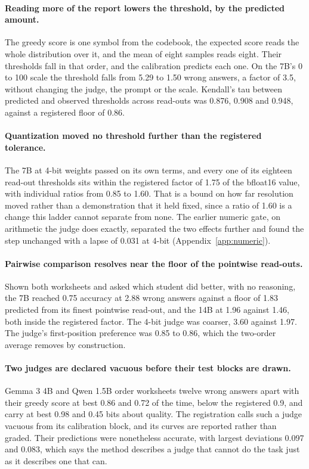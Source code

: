 \documentclass{article}
\theoremstyle{definition}
\theoremstyle{remark}
\begin{document}
\paragraph{Reading more of the report lowers the threshold, by the predicted amount.}
The greedy score is one symbol from the codebook, the expected score reads the whole distribution over it, and the mean of eight samples reads eight.
Their thresholds fall in that order, and the calibration predicts each one.
On the 7B's 0 to 100 scale the threshold falls from 5.29 to 1.50 wrong answers, a factor of 3.5, without changing the judge, the prompt or the scale.
Kendall's tau between predicted and observed thresholds across read-outs was 0.876, 0.908 and 0.948, against a registered floor of 0.86.

\paragraph{Quantization moved no threshold further than the registered tolerance.}
The 7B at 4-bit weights passed on its own terms, and every one of its eighteen read-out thresholds sits within the registered factor of 1.75 of the bfloat16 value, with individual ratios from 0.85 to 1.60.
That is a bound on how far resolution moved rather than a demonstration that it held fixed, since a ratio of 1.60 is a change this ladder cannot separate from none.
The earlier numeric gate, on arithmetic the judge does exactly, separated the two effects further and found the step unchanged with a lapse of 0.031 at 4-bit (Appendix~\ref{app:numeric}).

\paragraph{Pairwise comparison resolves near the floor of the pointwise read-outs.}
Shown both worksheets and asked which student did better, with no reasoning, the 7B reached 0.75 accuracy at 2.88 wrong answers against a floor of 1.83 predicted from its finest pointwise read-out, and the 14B at 1.96 against 1.46, both inside the registered factor.
The 4-bit judge was coarser, 3.60 against 1.97.
The judge's first-position preference was 0.85 to 0.86, which the two-order average removes by construction.

\paragraph{Two judges are declared vacuous before their test blocks are drawn.}
Gemma 3 4B and Qwen 1.5B order worksheets twelve wrong answers apart with their greedy score at best 0.86 and 0.72 of the time, below the registered 0.9, and carry at best 0.98 and 0.45 bits about quality.
The registration calls such a judge vacuous from its calibration block, and its curves are reported rather than graded.
Their predictions were nonetheless accurate, with largest deviations 0.097 and 0.083, which says the method describes a judge that cannot do the task just as it describes one that can.
\end{document}
